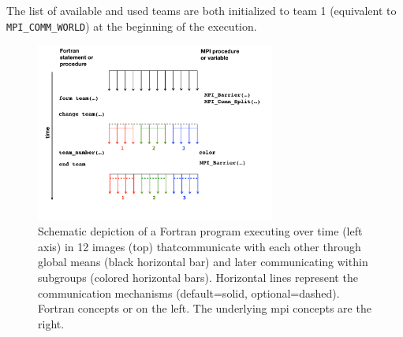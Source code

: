 The list of available and used teams are both initialized to team 1 (equivalent to \texttt{MPI\_COMM\_WORLD}) at the beginning of the execution.

\begin{figure}
\includegraphics[width=0.7\textwidth]{figures/teams}
\vspace{-36pt}
\caption{Schematic depiction of a Fortran program executing over time (left axis) in 12 images (top) thatcommunicate with each other through global means (black horizontal bar) and later communicating within subgroups (colored horizontal bars).  Horizontal lines represent the communication mechanisms (default=solid, optional=dashed).  Fortran concepts or on the left.  The underlying \gls{mpi} concepts are the right.}
\end{figure}
%

